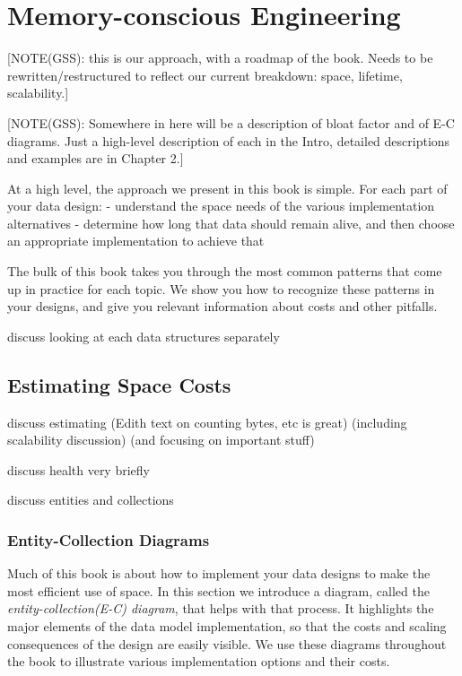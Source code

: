 \section{Memory-conscious Engineering}

[NOTE(GSS): this is our approach, with a roadmap of the book.
Needs to be rewritten/restructured to reflect our current breakdown: space,
lifetime, scalability.]

[NOTE(GSS): Somewhere in here will be a description of bloat factor and of E-C
diagrams.  Just a high-level description of each in the Intro, detailed
descriptions and examples are in Chapter 2.]

At a high level, the approach we present in this book is simple. For each part of your data design:
- understand the space needs of the various implementation alternatives
- determine how long that data should remain alive, and then choose an appropriate implementation to achieve that

The bulk of this book takes you through the most common patterns that come up in
practice for each topic. We show you how to recognize these patterns in your
designs, and give you relevant information about costs and other pitfalls.

discuss looking at each data structures separately

\subsection{Estimating Space Costs}

discuss estimating (Edith text on counting bytes, etc is great) (including
scalability discussion) (and focusing on important stuff)

discuss health very briefly

discuss entities and collections

\subsubsection{Entity-Collection Diagrams}

Much of this book is about how to implement your data designs to make the most
efficient use of space. In this section we introduce a diagram, called the
\emph{entity-collection(E-C) diagram}, that helps with that process. It
highlights the major elements of the data model implementation, so that the
costs and scaling consequences of the design are easily visible. We use these
diagrams throughout the book to illustrate various implementation options and
their costs.

